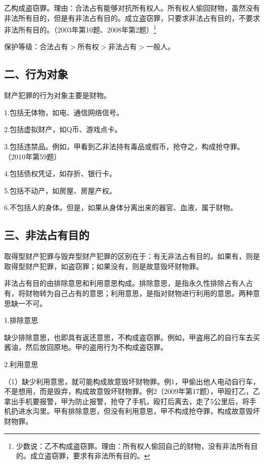 乙构成盗窃罪。理由：合法占有能够对抗所有权人。所有权人偷回财物，虽然没有非法所有目的，但是有非法占有目的。成立盗窃罪，只要求非法占有目的，不要求非法所有目的。（2003年第10题、2008年第2题）\footnote{少数说：乙不构成盗窃罪。理由：所有权人偷回自己的财物，没有非法所有目的。成立盗窃罪，要求有非法所有目的。}


保护等级：合法占有\ensuremath{>}所有权\ensuremath{>}非法占有\ensuremath{>}一般人。

\subsection*{二、行为对象}

财产犯罪的行为对象主要是财物。

1.包括无体物，如电、通信网络信号。

2.包括虚拟财产，如Q币、游戏点卡。

3.包括违禁品。例如，甲看到乙非法持有毒品或假币，抢夺之，构成抢夺罪。（2010年第59题）

4.包括债权凭证，如存折、银行卡。

5.包括不动产，如房屋、房屋产权。

6.不包括人的身体。但是，如果从身体分离出来的器官、血液，属于财物。

\subsection*{三、非法占有目的}

取得型财产犯罪与毁弃型财产犯罪的区别在于：有无非法占有目的。如果有，则是取得型财产犯罪，如盗窃罪；如果没有，则是故意毁坏财物罪。

非法占有目的由排除意思和利用意思构成。排除意思，是指永久性排除占有人占有，将财物转为自己占有的意思；利用意思，是指对财物进行利用的意思。两种意思缺一不可。

1.排除意思

缺少排除意思，也即具有返还意思，不构成盗窃罪。例如，甲盗用乙的自行车去买酱油，然后放回原地。甲的盗用行为不构成盗窃罪。

2.利用意思

（1）缺少利用意思，就可能构成故意毁坏财物罪。例1，甲偷出他人电动自行车，不是想用，而是毁弃，构成故意毁坏财物罪。例2（2009年第17题），甲殴打乙，乙拿出手机要报警，甲为防止报警，抢夺了手机，殴打后离去，走了5公里后，将手机扔进水沟里。甲有排除意思，但没有利用意思，甲不构成抢夺罪，构成故意毁坏财物罪。

